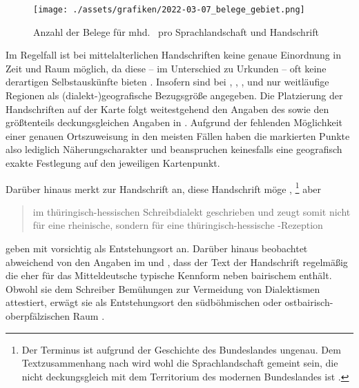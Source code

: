 \begin{figure}
\centering
\texttt{[image: ./assets/grafiken/2022-03-07\_belege\_gebiet.png]}
\caption[Anzahl der Belege für mhd.\  pro Sprachlandschaft und
Handschrift]{Anzahl der Belege für mhd.\  pro Sprachlandschaft
und Handschrift\nocite{wiesinger1983:rede}}
\label{fig:kartebelegzahl}
\end{figure}

Im Regelfall ist bei mittelalterlichen Handschriften keine genaue Einordnung in
Zeit und Raum möglich, da diese -- im Unterschied zu Urkunden -- oft keine
derartigen Selbstauskünfte bieten
\autocites[1309--1310]{wegera2000}[117--121]{bein2011}. Insofern sind bei
\citet{kc:C1}, \citet{kc:H}, \citet{kc:M}, \citet{kc:P} und \citet{kc:VB} nur
weitläufige Regionen als (dialekt-)geografische Bezugsgröße angegeben.%
Die Platzierung der Handschriften auf der Karte folgt weitestgehend den Angaben
des  \nosh\autocite{hsc} sowie den größtenteils deckungsgleichen
Angaben in \citet{kcdigital,wolf:kckat}. Aufgrund der fehlenden Möglichkeit
einer genauen Ortszuweisung in den meisten Fällen haben die markierten Punkte
also lediglich Näherungscharakter und beanspruchen keinesfalls eine geografisch
exakte Festlegung auf den jeweiligen Kartenpunkt.

Darüber hinaus merkt \citet{klein1988} zur Handschrift \citet{kc:H} an, diese
Handschrift möge ,%
%
	\footnote{Der Terminus  ist aufgrund der Geschichte des
	Bundeslandes ungenau. Dem Textzusammenhang nach wird wohl die
	Sprachlandschaft gemeint sein, die nicht deckungsgleich mit dem Territorium
	des modernen Bundeslandes ist \autocite[vgl.~z.\,B.][853]{wiesinger1983}.}
%
aber \blockcquote[118]{klein1988}{im thüringisch-hessischen Schreibdialekt
geschrieben und zeugt somit nicht für eine rheinische, sondern für eine
thüringisch-hessische \nocite{schroeder1895}-Rezeption}.
\textcites{kcdigital}[23]{wolf:kckat} geben mit
\citet[237--238]{millerzimmermann2007} vorsichtig  als
Entstehungsort an.
%
\label{phsec:vbherkunft}%
Darüber hinaus beobachtet \citeauthor{schneider1987a} abweichend von den
Angaben im  und \citet{kcdigital}, dass der Text der Handschrift
\citet{kc:VB} regelmäßig die eher für das Mitteldeutsche typische Kennform
  neben bairischem  enthält. Obwohl sie dem
Schreiber Bemühungen zur Vermeidung von Dialektismen attestiert, erwägt sie als
Entstehungsort den südböhmischen oder ostbairisch-oberpfälzischen Raum
\autocite[226]{schneider1987a}.

